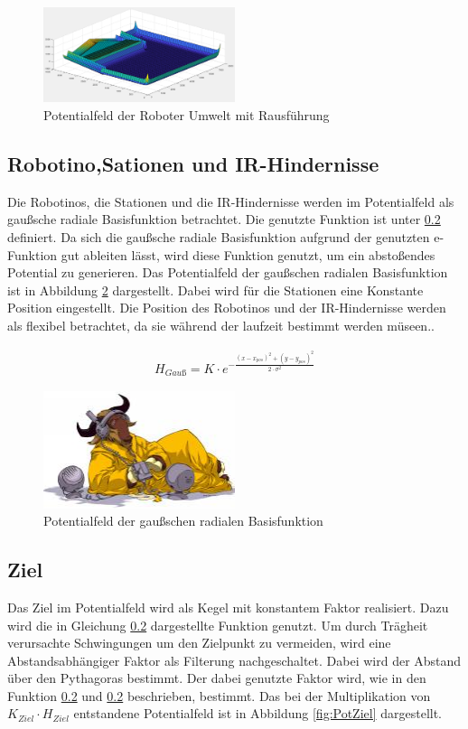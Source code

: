 \begin{figure}
	\centering	\includegraphics[width=0.5\textwidth]{grafiken/Potentialfeld_mit_2schraegen.png}
	\caption{Potentialfeld der Roboter Umwelt mit Rausführung}
	\label{fig:PotUmweltmit}
\end{figure}

\subsection{Robotino,Sationen und IR-Hindernisse}
Die Robotinos, die Stationen und die IR-Hindernisse werden im Potentialfeld als gaußsche radiale Basisfunktion betrachtet. Die genutzte Funktion ist unter \ref{} definiert. Da sich die gaußsche radiale Basisfunktion aufgrund der genutzten e-Funktion gut ableiten lässt, wird diese Funktion genutzt, um ein abstoßendes Potential zu generieren. Das Potentialfeld der gaußschen radialen Basisfunktion ist in Abbildung \ref{fig:PotRobotino} dargestellt. Dabei wird für die Stationen eine Konstante Position eingestellt. Die Position des Robotinos und der IR-Hindernisse werden als flexibel betrachtet, da sie während der laufzeit bestimmt werden müseen.. 

\begin{align}
H_{Gauß}=K\cdot e^{-\frac{(x-x_{pos})^2+(y-y_{pos})^2}{2\cdot \sigma^2}}
 \end{align}
 
\begin{figure}
	\centering	\includegraphics[width=0.5\textwidth]{grafiken/listen-tiny.jpg}
	\caption{Potentialfeld der gaußschen radialen Basisfunktion}
	\label{fig:PotRobotino}
\end{figure}

\subsection{Ziel}
Das Ziel im Potentialfeld wird als Kegel mit konstantem Faktor realisiert. Dazu wird die in Gleichung \ref{} dargestellte Funktion genutzt. Um durch Trägheit verursachte Schwingungen um den Zielpunkt zu vermeiden, wird eine Abstandsabhängiger Faktor als Filterung nachgeschaltet. Dabei wird der Abstand über den Pythagoras bestimmt. Der dabei genutzte Faktor wird, wie in den Funktion \ref{} und \ref{} beschrieben, bestimmt. Das bei der Multiplikation von \(K_{Ziel} \cdot H_{Ziel} \) entstandene Potentialfeld ist in Abbildung \ref{fig:PotZiel} dargestellt.

